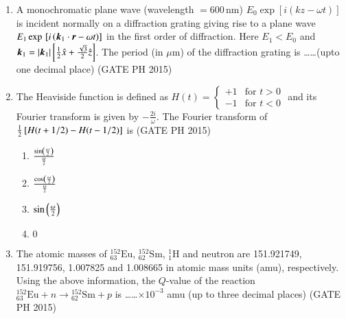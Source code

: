 \documentclass[journal]{IEEEtran}
\begin{document}
\begin{enumerate}
\item  A monochromatic plane wave (wavelength $= 600 \, \text{nm}$) $E_0 \exp[i(kz - \omega t)]$ is incident normally on a diffraction grating giving rise to a plane wave $E_1 \exp {}\left[ i \left( \bm{k}_1 \cdot \bm{r} - \omega t \right) \right]$ in the first order of diffraction. Here $E_1 < E_0$ and $\bm{k}_1 = \lvert \bm{k}_1 \rvert {}\left[ \frac{1}{2} \hat{x} + \frac{\sqrt{3}}{2} \hat{z} \right]$. The period (in $\mu \text{m}$) of the diffraction grating is \ldots\ldots (upto one decimal place) \hfill (GATE PH 2015)

\item The Heaviside function is defined as 
$ H(t) = \begin{cases} 
    +1 & \text{for } t > 0 \\
    -1 & \text{for } t < 0 
\end{cases}$
and its Fourier transform is given by $-\frac{2i}{\omega}$. The Fourier transform of $\frac{1}{2} {}\left[ H(t + 1/2) - H(t - 1/2) \right]$ is \hfill (GATE PH 2015)

\begin{multicols}{4}
    \begin{enumerate}
        \item $\frac{\sin \left( \frac{\omega}{2} \right)}{\frac{\omega}{2}}$
        \item $\frac{\cos \left( \frac{\omega}{2} \right)}{\frac{\omega}{2}}$
        \item $\sin \left( \frac{\omega}{2} \right)$
        \item $0$
    \end{enumerate}
\end{multicols}

\item The atomic masses of ${}^{152}_{63}\text{Eu}$, ${}^{152}_{62}\text{Sm}$, ${}^{1}_{1}\text{H}$ and neutron are 151.921749, 151.919756, 1.007825 and 1.008665 in atomic mass units (amu), respectively. Using the above information, the $Q$-value of the reaction ${}^{152}_{63}\text{Eu} + n \rightarrow {}^{152}_{62}\text{Sm} + p$ is \ldots\ldots $\times 10^{-3}$ amu (up to three decimal places) \hfill (GATE PH 2015)

\end{enumerate}
\end{document}
